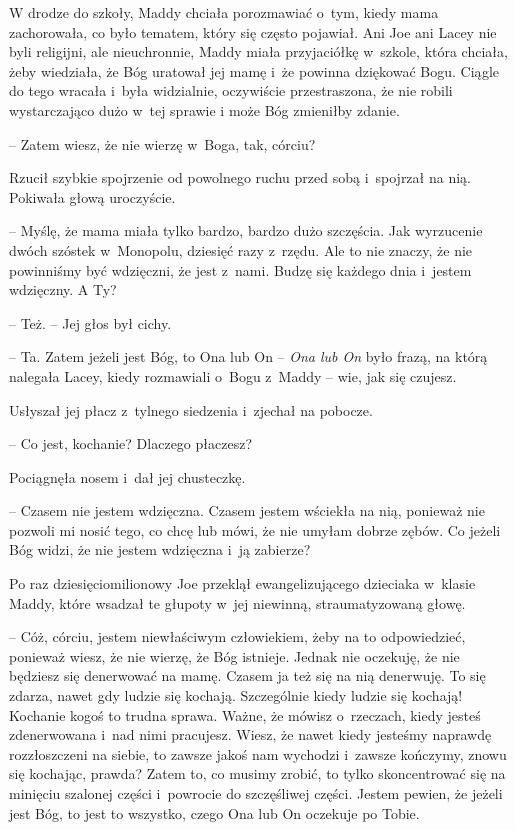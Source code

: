 \documentclass[oneside,polish,11pt,sfheadings]{mwbk}
\begin{document}
W drodze do szkoły, Maddy chciała porozmawiać o~tym, kiedy mama
zachorowała, co było tematem, który się często pojawiał. Ani Joe ani
Lacey nie byli religijni, ale nieuchronnie, Maddy miała przyjaciółkę w~szkole, która chciała, żeby wiedziała, że Bóg uratował jej mamę i~że
powinna dziękować Bogu. Ciągle do tego wracała i~była widzialnie,
oczywiście przestraszona, że nie robili wystarczająco dużo w~tej sprawie
i może Bóg zmieniłby zdanie.

-- Zatem wiesz, że nie wierzę w~Boga, tak, córciu?

Rzucił szybkie spojrzenie od powolnego ruchu przed sobą i~spojrzał na
nią. Pokiwała głową uroczyście.

-- Myślę, że mama miała tylko bardzo, bardzo dużo szczęścia. Jak
wyrzucenie dwóch szóstek w~Monopolu, dziesięć razy z~rzędu. Ale to nie
znaczy, że nie powinniśmy być wdzięczni, że jest z~nami. Budzę się
każdego dnia i~jestem wdzięczny. A Ty?

-- Też. -- Jej głos był cichy.

-- Ta. Zatem jeżeli jest Bóg, to Ona lub On -- \textit{Ona lub On} było
frazą, na którą nalegała Lacey, kiedy rozmawiali o~Bogu z~Maddy -- wie,
jak się czujesz.

Usłyszał jej płacz z~tylnego siedzenia i~zjechał na pobocze. 

-- Co jest,
kochanie? Dlaczego płaczesz?

Pociągnęła nosem i~dał jej chusteczkę. 

-- Czasem nie jestem wdzięczna.
Czasem jestem wściekła na nią, ponieważ nie pozwoli mi nosić tego, co
chcę lub mówi, że nie umyłam dobrze zębów. Co jeżeli Bóg widzi, że nie
jestem wdzięczna i~ją zabierze?

Po raz dziesięciomilionowy Joe przeklął ewangelizującego dzieciaka w~klasie Maddy, które wsadzał te głupoty w~jej niewinną, straumatyzowaną
głowę.

-- Cóż, córciu, jestem niewłaściwym człowiekiem, żeby na to odpowiedzieć,
ponieważ wiesz, że nie wierzę, że Bóg istnieje. Jednak nie oczekuję, że
nie będziesz się denerwować na mamę. Czasem ja też się na nią denerwuję.
To się zdarza, nawet gdy ludzie się kochają. Szczególnie kiedy ludzie
się kochają! Kochanie kogoś to trudna sprawa. Ważne, że mówisz o~rzeczach, kiedy jesteś zdenerwowana i~nad nimi pracujesz. Wiesz, że
nawet kiedy jesteśmy naprawdę rozzłoszczeni na siebie, to zawsze jakoś
nam wychodzi i~zawsze kończymy, znowu się kochając, prawda? Zatem to, co
musimy zrobić, to tylko skoncentrować się na minięciu szalonej części i~powrocie do szczęśliwej części. Jestem pewien, że jeżeli jest Bóg, to
jest to wszystko, czego Ona lub On oczekuje po Tobie.
\end{document}
